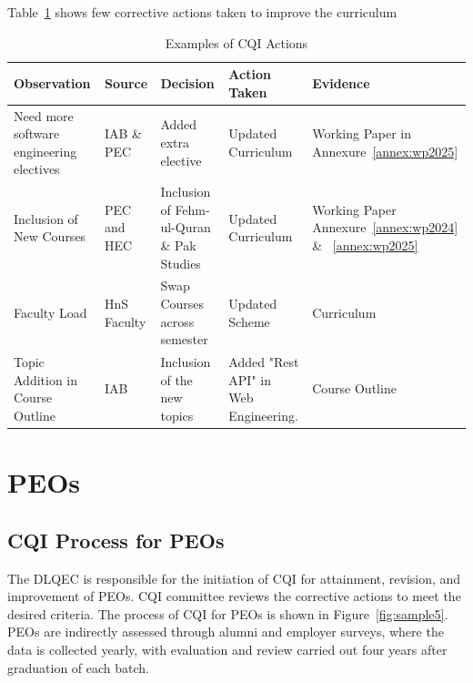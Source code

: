 Table~\ref{tab:cqi_actions1} shows few corrective actions taken to improve the curriculum
\begin{table}[ht]
\centering
\footnotesize
\setlength{\tabcolsep}{4pt}

\begin{tabular}{
>{\raggedright\arraybackslash}p{4cm}
>{\raggedright\arraybackslash}p{2cm}
>{\raggedright\arraybackslash}p{3cm}
>{\raggedright\arraybackslash}p{2.8cm}
>{\raggedright\arraybackslash}p{3cm}
}
\toprule
\textbf{Observation} &
\textbf{Source} &
\textbf{Decision} &
\textbf{Action Taken} &
\textbf{Evidence} \\
\midrule
Need more software engineering electives &
IAB \& PEC  &
Added extra elective &
Updated Curriculum &
Working Paper in Annexure~\ref{annex:wp2025} \\

Inclusion of New Courses &
PEC and HEC &
Inclusion of Fehm-ul-Quran \& Pak Studies &
Updated Curriculum &
Working Paper Annexure~\ref{annex:wp2024}  \& ~\ref{annex:wp2025}  \\

Faculty Load &
HnS Faculty &
Swap Courses across semester &
Updated Scheme &
Curriculum \\

Topic Addition in Course Outline &
IAB &
Inclusion of the new topics &
Added "Rest API" in Web Engineering.  &
Course Outline \\
\bottomrule
\end{tabular}
\caption{Examples of CQI Actions}
\label{tab:cqi_actions1}
\end{table}

\hypertarget{criterion-8-peos}{%
\section{PEOs}\label{criterion-8-peos}}

\hypertarget{criterion-8-cqi-process-for-peos}{%
\subsection{CQI Process for PEOs}\label{criterion-8-cqi-process-for-peos}}

The DLQEC is responsible for the initiation of CQI for attainment, revision, and improvement of PEOs. CQI committee reviews the corrective actions to meet the desired criteria. The process of CQI for PEOs is shown in Figure~\ref{fig:sample5}. PEOs are indirectly assessed through alumni and employer surveys, where the data is collected yearly, with evaluation and review carried out four years after graduation of each batch. 

